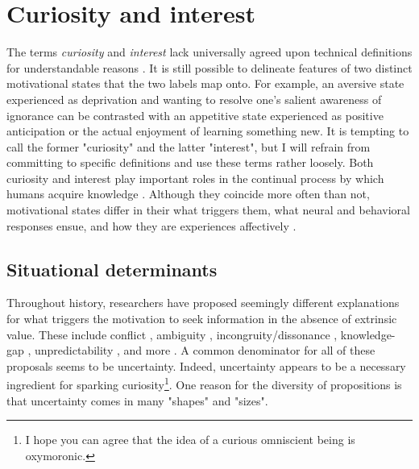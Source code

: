 \section{Curiosity and interest}

The terms \emph{curiosity} and \emph{interest} lack universally agreed upon technical definitions for understandable reasons \cite{kidd_psychology_2015,murayama_process_2019,dubey_reconciling_2020}. It is still possible to delineate features of two distinct motivational states that the two labels map onto. For example, an aversive state experienced as deprivation and wanting to resolve one's salient awareness of ignorance can be contrasted with an appetitive state experienced as positive anticipation or the actual enjoyment of learning something new. It is tempting to call the former "curiosity" and the latter "interest", but I will refrain from committing to specific definitions and use these terms rather loosely. Both curiosity and interest play important roles in the continual process by which humans acquire knowledge \cite{murayama_process_2019}. Although they coincide more often than not, motivational states differ in their what triggers them, what neural and behavioral responses ensue, and how they are experiences affectively \cite{day_curiosity_1982,grossnickle_disentangling_2016,hidi_interest_2019,shin_homo_2019,litman_curiosity_2019}.

\subsection{Situational determinants} 

Throughout history, researchers have proposed seemingly different explanations for what triggers the motivation to seek information in the absence of extrinsic value. These include conflict \cite{berlyne_theory_1954}, ambiguity \cite{ellsberg_risk_1961}, incongruity/dissonance \cite{hunt_experience_1960,festinger_theory_1962}, knowledge-gap \cite{loewenstein_psychology_1994}, unpredictability \cite{shin_homo_2019}, and more \cite[see ][for a review]{loewenstein_psychology_1994,oudeyer_what_2007,bazhydai_curiosity_2020}. A common denominator for all of these proposals seems to be uncertainty. Indeed, uncertainty appears to be a necessary ingredient for sparking curiosity\footnote{I hope you can agree that the idea of a curious omniscient being is oxymoronic.}. One reason for the diversity of propositions is that uncertainty comes in many "shapes" and "sizes".

